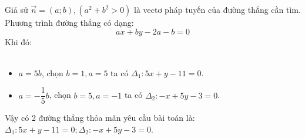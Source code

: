 \lgi
Giả sử $\vec{n}=(a;b), (a^2+b^2>0)$ là vectơ pháp tuyến của đường thẳng cần tìm. Phương trình đường thẳng có dạng:
$$ax + by -2a-b=0$$
Khi đó:\\
\cl{$\cos (d;\Delta) = \dfrac{1}{\sqrt{2}}  \Leftrightarrow  \dfrac{|2a+3b|}{\sqrt{a^2+b^2}\sqrt{4+9}}=\dfrac{1}{\sqrt{2}}  \Leftrightarrow 5a^2 -24ab-5b^2=0  \Leftrightarrow  \left[ \begin{array}{l}a=5b \\ a=-\dfrac{1}{5}b \end{array} \right.
$}\\
\begin{itemize}
\item $a=5b$, chọn $b=1,a=5$ ta có $\Delta_1: 5x+y-11=0$.
\item $a=-\dfrac{1}{5}b$, chọn $b=5,a=-1$ ta có $\Delta_2: -x+5y-3=0$.
\end{itemize}
Vậy có 2 đường thẳng thỏa mãn yêu cầu bài toán là: $\Delta_1: 5x+y-11=0; \Delta_2: -x+5y-3=0.$
